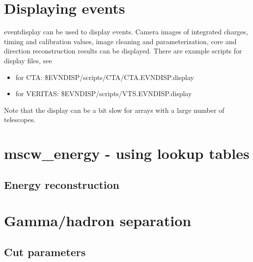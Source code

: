 \documentclass[titlepage,a4paper,twoside,11pt]{report}
\begin{document}
\chapter{Displaying events}

eventdisplay can be used to display events. 
Camera images of integrated charges, timing and calibration values, image cleaning and parameterization, core and direction reconstruction results can be displayed. 
There are example scripts for display files, see

\begin{itemize}
\item for CTA:  \$EVNDISP/scripts/CTA/CTA.EVNDISP.display
\item for VERITAS:  \$EVNDISP/scripts/VTS.EVNDISP.display
\end{itemize} 

Note that the display can be a bit slow for arrays with a large number of telescopes.

\chapter{mscw\_energy - using lookup tables}

\section{Energy reconstruction}
\label{SECTION.ENERGYRECONSTRUCTION} 





\chapter{Gamma/hadron separation}

\section{Cut parameters}
\label{SECTION.CUTS.PARAMETERFILE}
\end{document}
